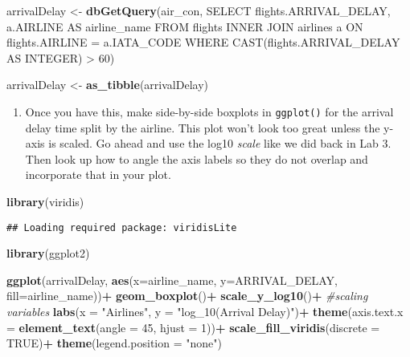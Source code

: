 \documentclass[
]{article}
\newenvironment{Shaded}{\begin{snugshade}}{\end{snugshade}}
\newcommand{\AttributeTok}[1]{\textcolor[rgb]{0.13,0.29,0.53}{#1}}
\newcommand{\CommentTok}[1]{\textcolor[rgb]{0.56,0.35,0.01}{\textit{#1}}}
\newcommand{\ConstantTok}[1]{\textcolor[rgb]{0.56,0.35,0.01}{#1}}
\newcommand{\DecValTok}[1]{\textcolor[rgb]{0.00,0.00,0.81}{#1}}
\newcommand{\FunctionTok}[1]{\textcolor[rgb]{0.13,0.29,0.53}{\textbf{#1}}}
\newcommand{\NormalTok}[1]{#1}
\newcommand{\OtherTok}[1]{\textcolor[rgb]{0.56,0.35,0.01}{#1}}
\newcommand{\SpecialCharTok}[1]{\textcolor[rgb]{0.81,0.36,0.00}{\textbf{#1}}}
\newcommand{\StringTok}[1]{\textcolor[rgb]{0.31,0.60,0.02}{#1}}
\providecommand{\tightlist}{%
  \setlength{\itemsep}{0pt}\setlength{\parskip}{0pt}}
\begin{document}
\begin{Shaded}
\begin{Highlighting}[]
\NormalTok{arrivalDelay }\OtherTok{\textless{}{-}} \FunctionTok{dbGetQuery}\NormalTok{(air\_con, }\StringTok{\textquotesingle{}SELECT flights.ARRIVAL\_DELAY, a.AIRLINE AS airline\_name}
\StringTok{                  FROM flights }
\StringTok{                  INNER JOIN airlines a}
\StringTok{                  ON  flights.AIRLINE = a.IATA\_CODE  }
\StringTok{                  WHERE CAST(flights.ARRIVAL\_DELAY AS INTEGER) \textgreater{} 60\textquotesingle{}}\NormalTok{)}
  
\NormalTok{arrivalDelay }\OtherTok{\textless{}{-}} \FunctionTok{as\_tibble}\NormalTok{(arrivalDelay)}
\end{Highlighting}
\end{Shaded}

\begin{enumerate}
\def\labelenumi{\arabic{enumi}.}
\setcounter{enumi}{1}
\tightlist
\item
  Once you have this, make side-by-side boxplots in \texttt{ggplot()}
  for the arrival delay time split by the airline. This plot won't look
  too great unless the y-axis is scaled. Go ahead and use the log10
  \emph{scale} like we did back in Lab 3. Then look up how to angle the
  axis labels so they do not overlap and incorporate that in your plot.
\end{enumerate}

\begin{Shaded}
\begin{Highlighting}[]
\FunctionTok{library}\NormalTok{(viridis)}
\end{Highlighting}
\end{Shaded}

\begin{verbatim}
## Loading required package: viridisLite
\end{verbatim}

\begin{Shaded}
\begin{Highlighting}[]
\FunctionTok{library}\NormalTok{(ggplot2)}

\FunctionTok{ggplot}\NormalTok{(arrivalDelay, }\FunctionTok{aes}\NormalTok{(}\AttributeTok{x=}\NormalTok{airline\_name, }\AttributeTok{y=}\NormalTok{ARRIVAL\_DELAY, }\AttributeTok{fill=}\NormalTok{airline\_name))}\SpecialCharTok{+}
  \FunctionTok{geom\_boxplot}\NormalTok{()}\SpecialCharTok{+}
  \FunctionTok{scale\_y\_log10}\NormalTok{()}\SpecialCharTok{+} \CommentTok{\#scaling variables}
  \FunctionTok{labs}\NormalTok{(}\AttributeTok{x =} \StringTok{"Airlines"}\NormalTok{, }
       \AttributeTok{y =} \StringTok{"log\_10(Arrival Delay)"}\NormalTok{)}\SpecialCharTok{+}
  \FunctionTok{theme}\NormalTok{(}\AttributeTok{axis.text.x =} \FunctionTok{element\_text}\NormalTok{(}\AttributeTok{angle =} \DecValTok{45}\NormalTok{, }\AttributeTok{hjust =} \DecValTok{1}\NormalTok{))}\SpecialCharTok{+}
  \FunctionTok{scale\_fill\_viridis}\NormalTok{(}\AttributeTok{discrete =} \ConstantTok{TRUE}\NormalTok{)}\SpecialCharTok{+}
  \FunctionTok{theme}\NormalTok{(}\AttributeTok{legend.position =} \StringTok{"none"}\NormalTok{)}
\end{Highlighting}
\end{Shaded}
\end{document}
